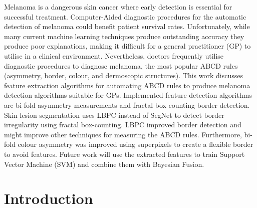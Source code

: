 \documentclass[10.5pt]{report}
\begin{document}
Melanoma is a dangerous skin cancer where early detection is essential for successful treatment. Computer-Aided diagnostic procedures for the automatic detection of melanoma could benefit patient survival rates. Unfortunately, while many current machine learning techniques produce outstanding accuracy they produce poor explanations, making it difficult for a general practitioner (GP) to utilise in a clinical environment. Nevertheless, doctors frequently utilise diagnostic procedures to diagnose melanoma, the most popular ABCD rules (asymmetry, border, colour, and dermoscopic structures). This work discusses feature extraction algorithms for automating ABCD rules to produce melanoma detection algorithms suitable for GPs. Implemented feature detection algorithms are bi-fold asymmetry measurements and fractal box-counting border detection. Skin lesion segmentation uses LBPC instead of SegNet to detect border irregularity using fractal box-counting. LBPC improved border detection and might improve other techniques for measuring the ABCD rules. Furthermore, bi-fold colour asymmetry was improved using superpixels to create a flexible border to avoid features. Future work will use the extracted features to train Support Vector Machine (SVM) and combine them with Bayesian Fusion.

\chapter{Introduction}
\end{document}
